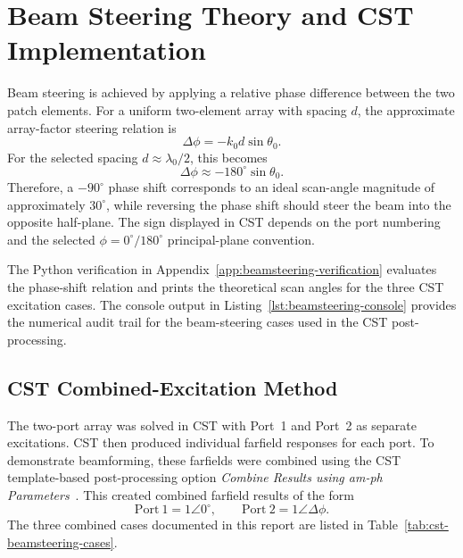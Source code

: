 \section{Beam Steering Theory and CST Implementation}
\label{sec:beamsteering}

Beam steering is achieved by applying a relative phase difference between the two patch elements. For
a uniform two-element array with spacing \(d\), the approximate array-factor steering relation is
\[
\Delta\phi=-k_0d\sin\theta_0.
\]
For the selected spacing \(d\approx \lambda_0/2\), this becomes
\[
\Delta\phi\approx -180^\circ\sin\theta_0.
\]
Therefore, a \(-90^\circ\) phase shift corresponds to an ideal scan-angle magnitude of approximately
\(30^\circ\), while reversing the phase shift should steer the beam into the opposite half-plane. The
sign displayed in CST depends on the port numbering and the selected \(\phi=0^\circ/180^\circ\)
principal-plane convention.

The Python verification in Appendix~\ref{app:beamsteering-verification} evaluates the phase-shift
relation and prints the theoretical scan angles for the three CST excitation cases. The console output
in Listing~\ref{lst:beamsteering-console} provides the numerical audit trail for the beam-steering
cases used in the CST post-processing.

\subsection{CST Combined-Excitation Method}

The two-port array was solved in CST with Port~1 and Port~2 as separate excitations. CST then
produced individual farfield responses for each port. To demonstrate beamforming, these farfields
were combined using the CST template-based post-processing option \emph{Combine Results using
am-ph Parameters}~\cite{cst_studio_suite}. This created combined farfield results of the form
\[
\mathrm{Port~1}=1\angle 0^\circ,\qquad \mathrm{Port~2}=1\angle \Delta\phi.
\]
The three combined cases documented in this report are listed in
Table~\ref{tab:cst-beamsteering-cases}.


